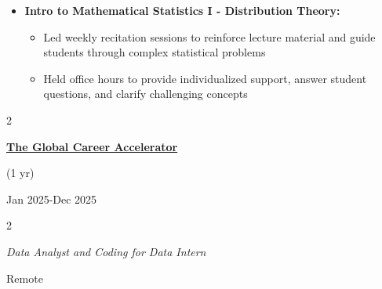 \documentclass[
  16,
]{article}
\providecommand{\tightlist}{%
  \setlength{\itemsep}{0pt}\setlength{\parskip}{0pt}}
\begin{document}
\begin{itemize}
\item
  \textbf{Intro to Mathematical Statistics I - Distribution Theory:}

  \begin{itemize}
  \tightlist
  \item
    Led weekly recitation sessions to reinforce lecture material and
    guide students through complex statistical problems
  \item
    Held office hours to provide individualized support, answer student
    questions, and clarify challenging concepts
  \end{itemize}
\end{itemize}

\vspace{3pt}

\begin{large}
  \begin{multicols}{2}
    \begin{flushleft}{\bf \href{https://globalcareeraccelerator.org}{The Global Career Accelerator}}\end{flushleft}
    \begin{flushright}
    \begin{small}(1 yr)\end{small}
    Jan 2025-Dec 2025\end{flushright}
  \end{multicols}
  \vspace{-0.17cm}
  \begin{multicols}{2}
    \begin{flushleft}\textit{Data Analyst and Coding for Data Intern}\end
    {flushleft}\begin{flushright}Remote\end
    {flushright}
  \end{multicols}
\end{large}
\vspace{-0.16cm}
\end{document}
